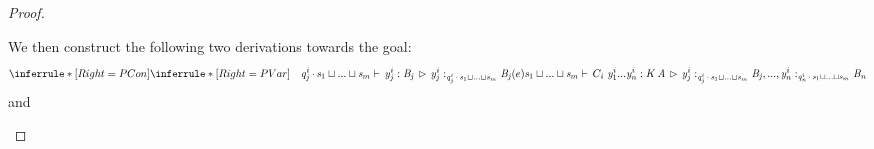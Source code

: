 \begin{proof}
\begin{enumerate}
        We then construct the following two derivations towards the goal:
        \begin{equation}
          \label{soundConLSub1}
          \inferrule*[Right=PCon]{\inferrule*[Right=PVar]{\quad}{ \GRANULEnt{q} ^  i  _  j     \textcolor{coeffectColor}{\,\cdot\,}      \GRANULEnt{s} _  1     \sqcup ... \sqcup    \GRANULEnt{s} _  m       \vdash \,   \GRANULEmv{y} ^i_j   :  \GRANULEnt{B_{\GRANULEmv{j}}}  \, \rhd \,   {  \GRANULEmv{y} ^  i  _  j   }:_{\textcolor{coeffectColor}{    \GRANULEnt{q} ^  i  _  j     \textcolor{coeffectColor}{\,\cdot\,}      \GRANULEnt{s} _  1     \sqcup ... \sqcup    \GRANULEnt{s} _  m       } }   \GRANULEnt{B_{\GRANULEmv{j}}} } \\  (e) }{\GRANULEnt{s} _  1     \sqcup ... \sqcup    \GRANULEnt{s} _  m       \vdash \,   C_{\GRANULEmv{i}}  \  \GRANULEmv{y} ^  i  _  1   ...  \GRANULEmv{y} ^  i  _  n    :   K  \, \GRANULEnt{A}  \, \rhd \,    {  \GRANULEmv{y} ^  i  _  j   }:_{\textcolor{coeffectColor}{    \GRANULEnt{q} ^  i  _  j     \textcolor{coeffectColor}{\,\cdot\,}      \GRANULEnt{s} _  1     \sqcup ... \sqcup    \GRANULEnt{s} _  m       } }   \GRANULEnt{B_{\GRANULEmv{j}}}   , ... ,   {  \GRANULEmv{y} ^  i  _  n   }:_{\textcolor{coeffectColor}{    \GRANULEnt{q} ^  i  _  n     \textcolor{coeffectColor}{\,\cdot\,}      \GRANULEnt{s} _  1     \sqcup ... \sqcup    \GRANULEnt{s} _  m       } }   \GRANULEnt{B_{\GRANULEmv{n}}}}\\
        \end{equation}
        and
        \begin{equation}
          \label{soundConLSub2}

\end{equation}
\end{enumerate}
\end{proof}
